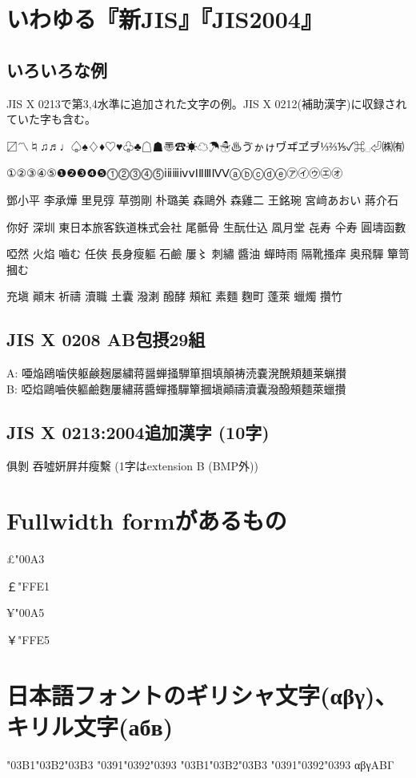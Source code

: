 \documentclass{ujarticle}
\begin{document}
\section{いわゆる『新JIS』『JIS2004』}
\subsection{いろいろな例}
JIS X 0213で第3,4水準に追加された文字の例。JIS X 0212(補助漢字)に収録されていた字も含む。

〼〽♮♫♬♩♤♠♢♦♡♥♧♣☖☗〠☎☀☁☂☃♨ゔゕゖヷヸヹヺ⅓⅔⅕✓⌘␣⏎㈱㈲

①②③④⑤❶❷❸❹❺⓵⓶⓷⓸⓹ⅰⅱⅲⅳⅴⅠⅡⅢⅣⅤⓐⓑⓒⓓⓔ㋐㋑㋒㋓㋔

鄧小平 李承燁 里見弴 草彅剛 朴璐美 森鷗外 森雞二 王銘琬 宮﨑あおい 蔣介石

你好 深圳 東日本旅客鉃道株式会社 尾骶骨 生酛仕込 凮月堂 㐂寿 仐寿 圓壔函數

啞然 火焰 嚙む 任俠 長身瘦軀 石鹼 屢〻 刺繡 醬油 蟬時雨 隔靴搔痒 奥飛驒 簞笥 摑む

充塡 顚末 祈禱 瀆職 土囊 潑溂 醱酵 頰紅 素麵 麴町 蓬萊 蠟燭 攢竹

\subsection{JIS X 0208 AB包摂29組}
{\gt
\noindent
A: 唖焔鴎噛侠躯鹸麹屡繍蒋醤蝉掻騨箪掴填顛祷涜嚢溌醗頬麺莱蝋攅\\
B: 啞焰鷗嚙俠軀鹼麴屢繡蔣醬蟬搔驒簞摑塡顚禱瀆囊潑醱頰麵萊蠟攢
}

\subsection{JIS X 0213:2004追加漢字 (10字)}
\noindent
俱剝%
吞噓姸屛幷瘦繫 (1字はextension B (BMP外))

\section{Fullwidth formがあるもの}
£\kchar\ucs"00A3%

￡\kchar\ucs"FFE1%

¥\kchar\ucs"00A5%

￥\kchar\ucs"FFE5%


\section{日本語フォントのギリシャ文字(αβγ)、キリル文字(абв)}
\char\ucs"03B1\char\ucs"03B2\char\ucs"03B3
\char\ucs"0391\char\ucs"0392\char\ucs"0393
\quad
\char"03B1\char"03B2\char"03B3
\char"0391\char"0392\char"0393
\quad
αβγΑΒΓ
\end{document}
